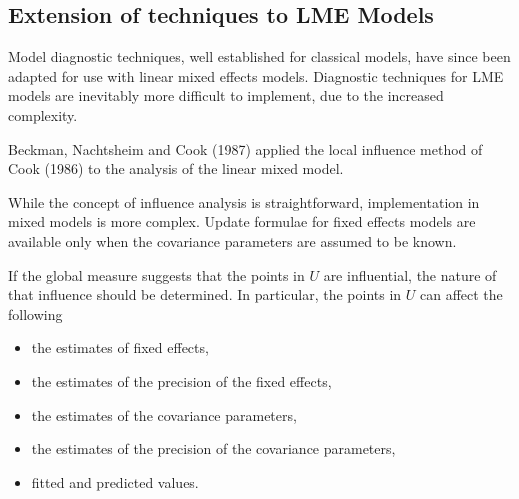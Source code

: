 \documentclass[Main.tex]{subfiles}
\begin{document}
\newpage

	
	

	
		\newpage
		\subsection{Extension of techniques to LME Models} %
		
		Model diagnostic techniques, well established for classical models, have since been adapted for use with linear mixed effects models. Diagnostic techniques for LME models are inevitably more difficult to implement, due to the increased complexity.
		
		Beckman, Nachtsheim and Cook (1987) \citet{Beckman} applied the local influence method of Cook (1986) to the analysis of the linear mixed model.
		
		While the concept of influence analysis is straightforward, implementation in mixed models is more complex. Update formulae for fixed effects models are available only when the covariance parameters are assumed to be known.
		
		If the global measure suggests that the points in $U$ are influential, the nature of that influence should be determined. In particular, the points in $U$ can affect the following
		
		\begin{itemize}
			\item the estimates of fixed effects,
			\item the estimates of the precision of the fixed effects,
			\item the estimates of the covariance parameters,
			\item the estimates of the precision of the covariance parameters,
			\item fitted and predicted values.
		\end{itemize}
		
		
		
		
	
	
	\newpage
\end{document}
